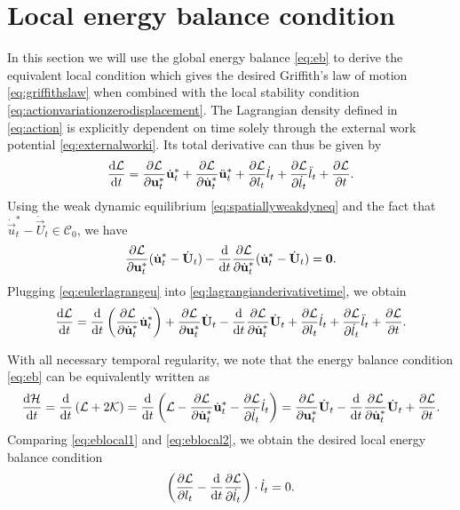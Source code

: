 \section{Local energy balance condition} \label{sec:ebcalc}
In this section we will use the global energy balance \eqref{eq:eb} to derive the equivalent local condition which gives the desired Griffith's law of motion \eqref{eq:griffithslaw} when combined with the local stability condition \eqref{eq:actionvariationzerodisplacement}. The Lagrangian density defined in \eqref{eq:action} is explicitly dependent on time solely through the external work potential \eqref{eq:externalworki}. Its total derivative can thus be given by
\begin{equation} \label{eq:lagrangianderivativetime}
\frac{\md\mathcal{L}}{\md t}=\frac{\partial\mathcal{L}}{\partial\vec{u}_t^*}\dot{\vec{u}}_t^*+\frac{\partial\mathcal{L}}{\partial\dot{\vec{u}}_t^*}\ddot{\vec{u}}_t^*+\frac{\partial\mathcal{L}}{\partial l_t}\dot{l}_t+\frac{\partial\mathcal{L}}{\partial\dot{l}_t}\ddot{l}_t+\frac{\partial\mathcal{L}}{\partial t}.
\end{equation}
Using the weak dynamic equilibrium \eqref{eq:spatiallyweakdyneq} and the fact that $\dot{\vec{u}}_t^*-\dot{\vec{U}}_t\in\mathcal{C}_0$, we have
\begin{equation} \label{eq:eulerlagrangeu}
\frac{\partial\mathcal{L}}{\partial\vec{u}_t^*}(\dot{\vec{u}}_t^*-\dot{\vec{U}}_t)-\frac{\md}{\md t}\frac{\partial\mathcal{L}}{\partial\dot{\vec{u}}_t^*}(\dot{\vec{u}}_t^*-\dot{\vec{U}}_t)=\vec{0}.
\end{equation}
Plugging \eqref{eq:eulerlagrangeu} into \eqref{eq:lagrangianderivativetime}, we obtain
\begin{equation} \label{eq:eblocal1}
\frac{\md\mathcal{L}}{\md t}=\frac{\md}{\md t}\left(\frac{\partial\mathcal{L}}{\partial\dot{\vec{u}}_t^*}\dot{\vec{u}}_t^*\right)+\frac{\partial\mathcal{L}}{\partial\vec{u}_t^*}\dot{\vec{U}}_t-\frac{\md}{\md t}\frac{\partial\mathcal{L}}{\partial\dot{\vec{u}}_t^*}\dot{\vec{U}}_t+\frac{\partial\mathcal{L}}{\partial l_t}\dot{l}_t+\frac{\partial\mathcal{L}}{\partial\dot{l}_t}\ddot{l}_t+\frac{\partial\mathcal{L}}{\partial t}.
\end{equation}

With all necessary temporal regularity, we note that the energy balance condition \eqref{eq:eb} can be equivalently written as
\begin{equation} \label{eq:eblocal2}
\frac{\md\mathcal{H}}{\md t}=\frac{\md}{\md t}\left(\mathcal{L}+2\mathcal{K}\right)=\frac{\md}{\md t}\left(\mathcal{L}-\frac{\partial\mathcal{L}}{\partial\dot{\vec{u}}_t^*}\dot{\vec{u}}_t^*-\frac{\partial\mathcal{L}}{\partial\dot{l}_t}\dot{l}_t\right)=\frac{\partial\mathcal{L}}{\partial\vec{u}_t^*}\dot{\vec{U}}_t-\frac{\md}{\md t}\frac{\partial\mathcal{L}}{\partial\dot{\vec{u}}_t^*}\dot{\vec{U}}_t+\frac{\partial\mathcal{L}}{\partial t}.
\end{equation}
Comparing \eqref{eq:eblocal1} and \eqref{eq:eblocal2}, we obtain the desired local energy balance condition
\[
\left(\frac{\partial\mathcal{L}}{\partial l_t}-\frac{\mathrm{d}}{\mathrm{d} t}\frac{\partial\mathcal{L}}{\partial\dot{l}_t}\right)\cdot\dot{l}_t=0.
\]

